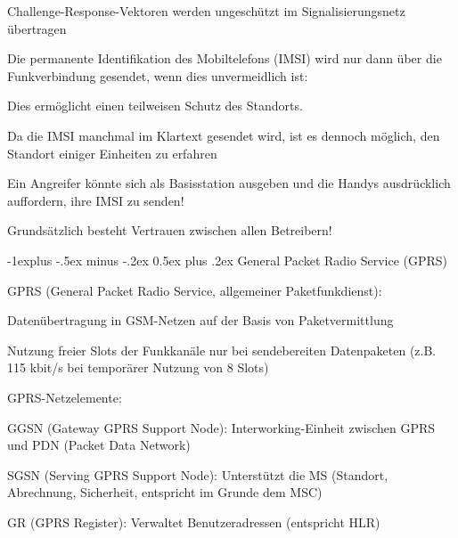 \documentclass[a4paper]{article}
\makeatletter
\renewcommand{\subsection}{\@startsection{subsection}{2}{0mm}%
 {-1explus -.5ex minus -.2ex}%
 {0.5ex plus .2ex}%
 {\normalfont\normalsize\bfseries}}
\makeatother
\begin{document}
\begin{multicols}{3}
\begin{itemize*}
\begin{itemize*}
                  \item Challenge-Response-Vektoren werden ungeschützt im Signalisierungsnetz übertragen
            \end{itemize*}
            \item Die permanente Identifikation des Mobiltelefons (IMSI) wird nur dann über die Funkverbindung gesendet, wenn dies unvermeidlich ist:
            \begin{itemize*}
                  \item Dies ermöglicht einen teilweisen Schutz des Standorts.
                  \item Da die IMSI manchmal im Klartext gesendet wird, ist es dennoch möglich, den Standort einiger Einheiten zu erfahren
                  \item Ein Angreifer könnte sich als Basisstation ausgeben und die Handys ausdrücklich auffordern, ihre IMSI zu senden!
            \end{itemize*}
            \item Grundsätzlich besteht Vertrauen zwischen allen Betreibern!
      \end{itemize*}

      \subsection{General Packet Radio Service (GPRS)}
      \begin{itemize*}
            \item GPRS (General Packet Radio Service, allgemeiner Paketfunkdienst):
            \begin{itemize*}
                  \item Datenübertragung in GSM-Netzen auf der Basis von Paketvermittlung
                  \item Nutzung freier Slots der Funkkanäle nur bei sendebereiten Datenpaketen (z.B. 115 kbit/s bei temporärer Nutzung von 8 Slots)
            \end{itemize*}
            \item GPRS-Netzelemente:
            \begin{itemize*}
                  \item GGSN (Gateway GPRS Support Node): Interworking-Einheit zwischen GPRS und PDN (Packet Data Network)
                  \item SGSN (Serving GPRS Support Node): Unterstützt die MS (Standort, Abrechnung, Sicherheit, entspricht im Grunde dem MSC)
                  \item GR (GPRS Register): Verwaltet Benutzeradressen (entspricht HLR)
            \end{itemize*}
      \end{itemize*}


\end{multicols}
\end{document}
